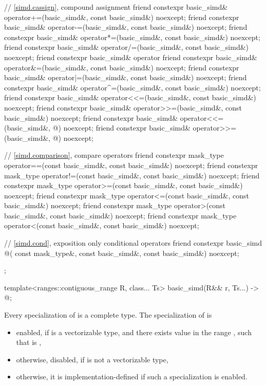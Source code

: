 \begin{codeblock}
{  // \ref{simd.cassign},  compound assignment
  friend constexpr basic_simd& operator+=(basic_simd&, const basic_simd&) noexcept;
  friend constexpr basic_simd& operator-=(basic_simd&, const basic_simd&) noexcept;
  friend constexpr basic_simd& operator*=(basic_simd&, const basic_simd&) noexcept;
  friend constexpr basic_simd& operator/=(basic_simd&, const basic_simd&) noexcept;
  friend constexpr basic_simd& operator%
  friend constexpr basic_simd& operator&=(basic_simd&, const basic_simd&) noexcept;
  friend constexpr basic_simd& operator|=(basic_simd&, const basic_simd&) noexcept;
  friend constexpr basic_simd& operator^=(basic_simd&, const basic_simd&) noexcept;
  friend constexpr basic_simd& operator<<=(basic_simd&, const basic_simd&) noexcept;
  friend constexpr basic_simd& operator>>=(basic_simd&, const basic_simd&) noexcept;
  friend constexpr basic_simd& operator<<=(basic_simd&, @\simdsizetype@) noexcept;
  friend constexpr basic_simd& operator>>=(basic_simd&, @\simdsizetype@) noexcept;

  // \ref{simd.comparison},  compare operators
  friend constexpr mask_type operator==(const basic_simd&, const basic_simd&) noexcept;
  friend constexpr mask_type operator!=(const basic_simd&, const basic_simd&) noexcept;
  friend constexpr mask_type operator>=(const basic_simd&, const basic_simd&) noexcept;
  friend constexpr mask_type operator<=(const basic_simd&, const basic_simd&) noexcept;
  friend constexpr mask_type operator>(const basic_simd&, const basic_simd&) noexcept;
  friend constexpr mask_type operator<(const basic_simd&, const basic_simd&) noexcept;

  // \ref{simd.cond},  exposition only conditional operators
  friend constexpr basic_simd @\simdselect@(
    const mask_type&, const basic_simd&, const basic_simd&) noexcept;
};

template<ranges::contiguous_range R, class... Ts>
  basic_simd(R&& r, Ts...) -> @\seebelow@;
\end{codeblock}

\pnum
Every specialization of  is a complete type.
The specialization of  is
\begin{itemize}
  \item enabled, if  is a vectorizable type, and there exists value  in the range
    , such that  is ,
  \item otherwise, disabled, if  is not a vectorizable type,
  \item otherwise, it is implementation-defined if such a specialization is enabled.
\end{itemize}

